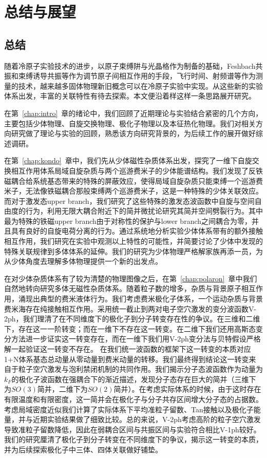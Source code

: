 \chapter{总结与展望}\label{chap:sum}

\section{总结}
随着冷原子实验技术的进步，以原子束缚阱与光晶格作为制备的基础，Feshbach共振和束缚诱导共振等作为调节原子间相互作用的手段，飞行时间、射频谱等作为测量的技术，越来越多固体物理新旧概念可以在冷原子实验中实现。从这些新的实验体系出发，丰富的关联特性有待去探索。本文便沿着样这样一条思路展开研究。

在第~\ref{chap:intro}~章的绪论中，我们回顾了近期理论与实验结合紧密的几个方向，主要包括少体物理、自旋交换物理、极化子物理以及本征热化物理。我们对相关方向研究做了理论与实验的回顾，熟悉该方向研究背景的，为后续工作的展开做好综述调研。

在第~\ref{chap:kondo}~章中，我们先从少体磁性杂质体系出发，探究了一维下自旋交换相互作用体系局域自旋杂质与两个巡游费米子的少体能谱结构。我们发现了反铁磁耦合给系统基态带来的特殊的屏蔽效应，使得局域自旋杂质只能束缚一个巡游费米子，无法像铁磁耦合那般束缚两个巡游费米子，这是一种特殊的少体关联效应。而对于激发态upper branch，我们研究了这些特殊的激发态波函数中自旋与空间自由度的行为，利用无限大耦合附近下的简并微扰论研究其简并空间劈裂行为。其中最为特殊的铁磁upper branch由于对称性的保护与lower branch之间耦合为零，并且具有良好的自旋电荷分离的行为。通过系统地分析实验少体体系带有的额外接触相互作用，我们研究在实验中观测以上特性的可能性，并简要讨论了少体中发现的特殊关联规律到多体体系的延伸。我们的研究为少体物理严格解家族再添一员，为从少体角度去理解多体物理提供一个新的出发点。

在对少体杂质体系有了较为清楚的物理图像之后，在第~\ref{chap:polaron}~章中我们自然地转向研究多体无磁性杂质体系。随着粒子数的增多，杂质与背景原子相互作用，涌现出典型的费米液体行为。我们考虑费米极化子体系，一个运动杂质与背景费米海存在纯接触相互作用。采用统一截止到两对电子空穴激发的变分波函数V-2ph，我们理清了在不同维度下的极化子到分子转变存在性的争议。在三维和二维下，存在这一一阶转变；而在一维下不存在这一转变。在二维下我们还用高斯态变分方法进一步证实这一转变存在，而在一维下我们用V-2ph变分法与贝特假设严格解一起验证这一转变不存在。 在我们统一波函数的框架下这一转变的本质对应1+N体系基态总动量从零动量到费米动量的转移。我们最终得到结论这一转变来自于粒子空穴激发与泡利禁闭机制的共同作用。我们揭示分子态波函数作为动量为$k_F$的极化子波函数在强耦合下的渐近描述，发现分子态存在巨大的简并（三维下为$SO(3)$简并，二维下为$SO(2)简并$）。在考虑实际体系的时候，由于这时存在有限温度和有限密度，这一简并会在极化子与分子共存区间增大分子态的占据数。考虑局域密度近似我们计算了实际体系下平均准粒子留数、Tan接触以及极化子能量，并与近期实验结果做了细致比较。总的来说，V-2ph考虑高阶的粒子空穴激发导致准粒子留数降低，因此在弱耦合区间与共振区间与实验符合相比V-1ph较好。我们的研究厘清了极化子到分子转变在不同维度下的争议，揭示这一转变的本质，并为后续探索极化子中三体、四体关联做好铺垫。

